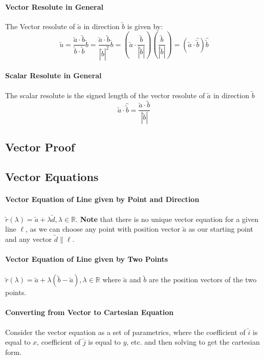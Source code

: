 \documentclass[a4paper,twoside]{article}
\begin{document}
			\paragraph{Vector Resolute in General}
			The Vector resolute of $\utilde{a}$ in direction $\utilde{b}$ is given by:
			\[
				\utilde{u}=\frac{\utilde{a}\cdot\utilde{b}}{\utilde{b}\cdot\utilde{b}}\utilde{b}=\frac{\utilde{a}\cdot\utilde{b}}{|\utilde{b}|^2}\utilde{b}=\left(\utilde{a}\cdot\frac{\utilde{b}}{|\utilde{b}|}\right)\left(\frac{\utilde{b}}{|\utilde{b}|}\right)=\left(\utilde{a}\cdot\hat{\utilde{b}}\right)\hat{\utilde{b}}
			\]
			\paragraph{Scalar Resolute in General} The scalar resolute is the signed length of the vector resolute of $\utilde{a}$ in direction $\utilde{b}$
			\[
				\utilde{a}\cdot\hat{\utilde{b}}=\frac{\utilde{a}\cdot\utilde{b}}{|\utilde{b}|}
			\]
		\subsection{Vector Proof}
		\subsection{Vector Equations}
			\paragraph{Vector Equation of Line given by Point and Direction} $\utilde{r}(\lambda)=\utilde{a}+\lambda\utilde{d},\lambda\in\mathbb{R}$. \textbf{Note} that there is no unique vector equation for a given line $\ell$, as we can choose any point with position vector $\utilde{a}$ as our starting point and any vector $\utilde{d}\parallel \ell$.
			
			\paragraph{Vector Equation of Line given by Two Points} $\utilde{r}(\lambda)=\utilde{a}+\lambda\left(\utilde{b}-\utilde{a}\right),\lambda\in\mathbb{R}$ where $\utilde{a}$ and $\utilde{b}$ are the position vectors of the two points.
			
			\paragraph{Converting from Vector to Cartesian Equation} Consider the vector equation as a set of parametrics, where the coefficient of $\utilde{i}$ is equal to $x$, coefficient of $\utilde{j}$ is equal to $y$, etc. and then solving to get the cartesian form.
			
\end{document}

